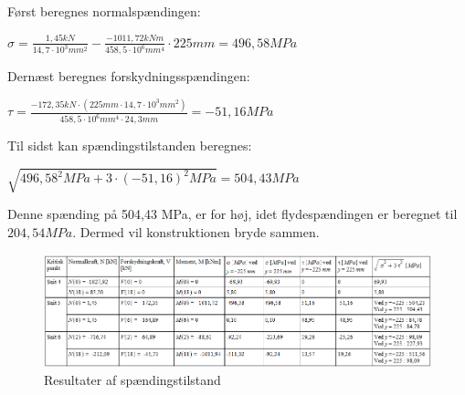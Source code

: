 Først beregnes normalspændingen:
\begin{center}
	$\sigma = \frac{1,\!45 kN}{14,\!7 \cdot 10^3 mm^2} - \frac{-1011,\!72 kNm}{458,\!5 \cdot 10^6 mm^4} \cdot 225 mm = 496,\!58 MPa$
\end{center}

Dernæst beregnes forskydningsspændingen:
\begin{center}
	$\tau = \frac{-172,\!35 kN \cdot (225 mm \cdot 14,\!7\cdot10^3 mm^2)}{458,\!5\cdot10^6 mm^4 \cdot 24,\!3 mm} = -51,\!16 MPa$
\end{center}

Til sidst kan spændingstilstanden beregnes:
\begin{center}
	$\sqrt{496,\!58^2 MPa + 3 \cdot (-51,\!16)^2 MPa} = 504,\!43 MPa$
\end{center}

Denne spænding på 504,43 MPa, er for høj, idet flydespændingen er beregnet til $204,\!54 MPa$. Dermed vil konstruktionen bryde sammen.

 \begin{figure}[H]
 	\centering
 	\includegraphics[width=1.2\textwidth]{billeder/tabelspanding.png}
 	\caption{Resultater af spændingstilstand}
 	\label{fig:tabelspanding}
 \end{figure}

